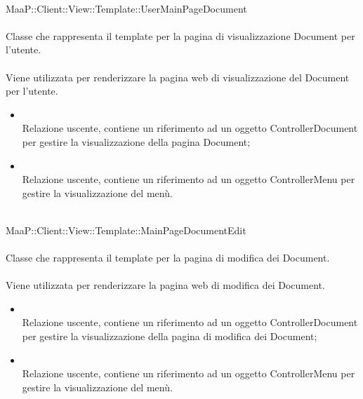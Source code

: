 \\
MaaP::Client::View::Template::UserMainPageDocument\\
\\
Classe che rappresenta il template per la pagina di visualizzazione Document per l'utente.\\
\\
Viene utilizzata per renderizzare la pagina web di visualizzazione del Document per l'utente.\\
\begin{itemize}
\item{}\\
Relazione uscente, contiene un riferimento ad un oggetto ControllerDocument per gestire la visualizzazione della pagina Document;
\item{}\\
Relazione uscente, contiene un riferimento ad un oggetto ControllerMenu per gestire la visualizzazione del menù.
\end{itemize}

\\
MaaP::Client::View::Template::MainPageDocumentEdit\\
\\
Classe che rappresenta il template per la pagina di modifica dei Document.\\
\\
Viene utilizzata per renderizzare la pagina web di modifica dei Document.\\
\begin{itemize}
\item{}\\
Relazione uscente, contiene un riferimento ad un oggetto ControllerDocument per gestire la visualizzazione della pagina di modifica dei Document;
\item{}\\
Relazione uscente, contiene un riferimento ad un oggetto ControllerMenu per gestire la visualizzazione del menù.
\end{itemize}

